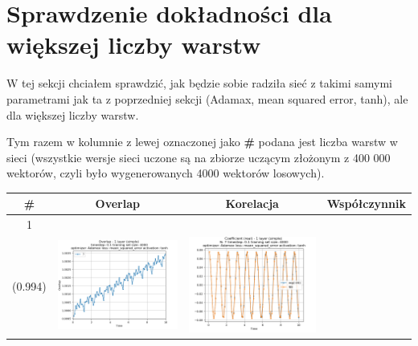\documentclass{article}
\begin{document}
\section{Sprawdzenie dokładności dla większej liczby warstw}

W tej sekcji chciałem sprawdzić, jak będzie sobie radziła sieć z takimi samymi parametrami jak ta z poprzedniej sekcji (Adamax, mean squared error, tanh), ale dla większej liczby warstw.

Tym razem w kolumnie z lewej oznaczonej jako \textbf{\#} podana jest liczba warstw w sieci (wszystkie wersje sieci uczone są na zbiorze uczącym złożonym z 400 000 wektorów, czyli było wygenerowanych 4000 wektorów losowych).

\begin{tabular}{|c|c|c|c|} \hline
     \# & Overlap & Korelacja & Współczynnik  \\ \hline
     1 \\ (0.994) &
     \includegraphics[scale=0.37]{./1_layer_simple_train_samples=4000_timestep=0.1_t_total=10.0_optimizer=Adamax_loss=mean_squared_error_activation=tanh/Overlap.png} &
     \includegraphics[scale=0.37]{./1_layer_simple_train_samples=4000_timestep=0.1_t_total=10.0_optimizer=Adamax_loss=mean_squared_error_activation=tanh/Coeff_N=7_(real).png} &

\end{tabular}
\end{document}
